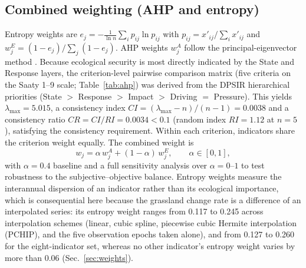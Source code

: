 \documentclass[preprint,11pt,authoryear]{elsarticle}
\begin{document}
\subsection{Combined weighting (AHP and entropy)}
Entropy weights are $e_j=-\frac{1}{\ln n}\sum_i p_{ij}\ln p_{ij}$ with $p_{ij}=x'_{ij}/\sum_i x'_{ij}$ and $w^{E}_j=(1-e_j)/\sum_j(1-e_j)$. AHP weights $w^{A}_j$ follow the principal-eigenvector method \citep{saaty1980analytic}. Because ecological security is most directly indicated by the State and Response layers, the criterion-level pairwise comparison matrix (five criteria on the Saaty 1--9 scale; Table~\ref{tab:ahp}) was derived from the DPSIR hierarchical priorities (State $>$ Response $>$ Impact $>$ Driving $=$ Pressure). This yields $\lambda_{\max}=5.015$, a consistency index $CI=(\lambda_{\max}-n)/(n-1)=0.0038$ and a consistency ratio $CR=CI/RI=0.0034<0.1$ (random index $RI=1.12$ at $n=5$), satisfying the consistency requirement. Within each criterion, indicators share the criterion weight equally. The combined weight is
\begin{equation}
w_j=\alpha\,w^{A}_j+(1-\alpha)\,w^{E}_j,\qquad \alpha\in[0,1],
\label{eq:weight}
\end{equation}
with $\alpha=0.4$ baseline and a full sensitivity analysis over $\alpha=0$--$1$ to test robustness to the subjective--objective balance. Entropy weights measure the interannual dispersion of an indicator rather than its ecological importance, which is consequential here because the grassland change rate is a difference of an interpolated series: its entropy weight ranges from 0.117 to 0.245 across interpolation schemes (linear, cubic spline, piecewise cubic Hermite interpolation (PCHIP), and the five observation epochs taken alone), and from 0.127 to 0.260 for the eight-indicator set, whereas no other indicator's entropy weight varies by more than 0.06 (Sec.~\ref{sec:weights}).
\end{document}
